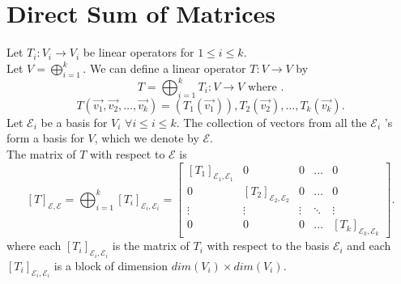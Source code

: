 \documentclass{report}
\begin{document}
 \section{Direct Sum of Matrices}
 Let $ T_i: V_i \to V_i$ be linear operators for $ 1 \leq i \leq k$.\\
 Let $ V = \bigoplus_{i=1} ^{k}$. We can define a linear operator $ T: V \to V$ by
 \[
 T = \bigoplus_{i=1} ^{k} T_i: V \to V \text{ where }
 .\] 
 \[
 T \left( \vec{ v_1} ,\vec{ v_2} ,\ldots , \vec{ v_k }  \right)  = \left(  T_1 \left( \vec{ v_1}  \right)  \right) , T_2 \left( \vec{ v_2}  \right) ,\ldots , T_k \left( \vec{ v_k}  \right)
 .\] 
 Let $ \mathcal{E} _i$ be a basis for $ V_i$ $ \forall  i \le i \le k$. The collection of vectors from all the $ \mathcal{E}_i$ 's form a basis for $ V$, which we denote by $ \mathcal{E}$.\\
 The matrix of $ T$ with respect to $ \mathcal{E}$ is 
 \[
  \left[ T \right] _{ \mathcal{E}, \mathcal{E}}= \bigoplus_{i=1} ^{k} \left[ T_i \right] _{ \mathcal{E}_i, \mathcal{E}_i} = \begin{bmatrix}
	  \left[ T_1 \right] _{ \mathcal{E}_1, \mathcal{E}_1} & 0 & 0 & \dots  & 0 \\
	  0 & \left[ T_2 \right] _{ \mathcal{E}_2 , \mathcal{E}_2} & 0 & \dots  & 0 \\
  \vdots & \vdots & \vdots & \ddots & \vdots \\
0 & 0 & 0 & \dots  & \left[ T_k \right] _{ \mathcal{E} _k , \mathcal{E} _k}\end{bmatrix}
 .\] 
 where each $ \left[ T_i \right] _{ \mathcal{E}_i, \mathcal{E}_i}$ is the matrix of $ T_i$ with respect to the basis $ \mathcal{E}_i$ and each $ \left[ T_i \right] _{ \mathcal{E} _i , \mathcal{E} _i} $ is a block of dimension $ dim \left( V_i \right) \times dim \left( V_i \right)$.\\
\end{document}
